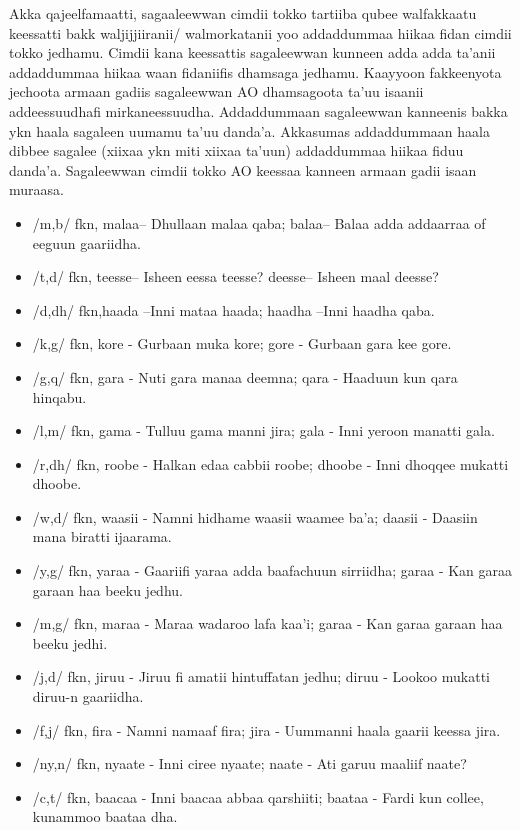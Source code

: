 \documentclass[11pt,b5paper]{book}
\begin{document}
Akka qajeelfamaatti, sagaaleewwan cimdii tokko tartiiba  qubee walfakkaatu keessatti bakk waljijjiiranii/ walmorkatanii yoo addaddummaa hiikaa fidan cimdii tokko  jedhamu. Cimdii kana keessattis sagaleewwan kunneen adda  adda ta’anii addaddummaa hiikaa waan fidaniifis dhamsaga  jedhamu. Kaayyoon fakkeenyota jechoota armaan gadiis  sagaleewwan AO dhamsagoota ta’uu isaanii addeessuudhafi  mirkaneessuudha. Addaddummaan sagaleewwan kanneenis  bakka ykn haala sagaleen uumamu ta’uu danda’a. Akkasumas  addaddummaan haala dibbee sagalee (xiixaa ykn miti xiixaa  ta’uun) addaddummaa hiikaa fiduu danda’a. Sagaleewwan  cimdii tokko AO keessaa kanneen armaan gadii isaan  muraasa.
 
\begin{itemize}
        \item/m,b/ fkn, malaa– Dhullaan malaa qaba; balaa– Balaa adda addaarraa of eeguun gaariidha.
        \item/t,d/ fkn, teesse– Isheen eessa teesse? deesse– Isheen maal deesse? 
        \item/d,dh/ fkn,haada –Inni mataa haada; haadha –Inni haadha qaba. 
        \item/k,g/ fkn, kore - Gurbaan muka kore; gore - Gurbaan gara kee gore. 
        \item/g,q/ fkn, gara - Nuti gara manaa deemna; qara - Haaduun kun qara hinqabu. 
        \item/l,m/ fkn, gama - Tulluu gama manni jira; gala - Inni yeroon manatti gala. 
        \item/r,dh/ fkn, roobe - Halkan edaa cabbii roobe; dhoobe - Inni dhoqqee mukatti dhoobe. 
        \item/w,d/ fkn, waasii - Namni hidhame waasii waamee ba’a; daasii - Daasiin mana biratti ijaarama. 
        \item/y,g/ fkn, yaraa - Gaariifi yaraa adda baafachuun sirriidha; garaa - Kan garaa garaan haa beeku jedhu. 
        \item/m,g/ fkn, maraa - Maraa wadaroo lafa kaa’i; garaa - Kan garaa garaan haa beeku jedhi.  
        \item/j,d/ fkn, jiruu - Jiruu fi amatii hintuffatan jedhu; diruu - Lookoo mukatti diruu-n gaariidha. 
        \item/f,j/ fkn, fira - Namni namaaf fira; jira - Uummanni haala gaarii keessa jira. 
        \item/ny,n/ fkn, nyaate - Inni ciree nyaate; naate - Ati garuu maaliif naate?
        \item/c,t/ fkn, baacaa - Inni baacaa abbaa qarshiiti; baataa - Fardi kun collee, kunammoo baataa dha. 

\end{itemize}
\end{document}
